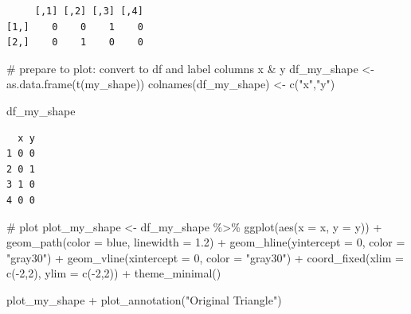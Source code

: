 \documentclass[
  letterpaper,
  DIV=11,
  numbers=noendperiod]{scrartcl}
\newenvironment{Shaded}{\begin{snugshade}}{\end{snugshade}}
\newcommand{\AttributeTok}[1]{\textcolor[rgb]{0.40,0.45,0.13}{#1}}
\newcommand{\CommentTok}[1]{\textcolor[rgb]{0.37,0.37,0.37}{#1}}
\newcommand{\DecValTok}[1]{\textcolor[rgb]{0.68,0.00,0.00}{#1}}
\newcommand{\FloatTok}[1]{\textcolor[rgb]{0.68,0.00,0.00}{#1}}
\newcommand{\FunctionTok}[1]{\textcolor[rgb]{0.28,0.35,0.67}{#1}}
\newcommand{\NormalTok}[1]{\textcolor[rgb]{0.00,0.23,0.31}{#1}}
\newcommand{\OtherTok}[1]{\textcolor[rgb]{0.00,0.23,0.31}{#1}}
\newcommand{\SpecialCharTok}[1]{\textcolor[rgb]{0.37,0.37,0.37}{#1}}
\newcommand{\StringTok}[1]{\textcolor[rgb]{0.13,0.47,0.30}{#1}}
\begin{document}
\begin{verbatim}
     [,1] [,2] [,3] [,4]
[1,]    0    0    1    0
[2,]    0    1    0    0
\end{verbatim}

\begin{Shaded}
\begin{Highlighting}[]
\CommentTok{\# prepare to plot: convert to df and label columns x \& y}
\NormalTok{df\_my\_shape }\OtherTok{\textless{}{-}} \FunctionTok{as.data.frame}\NormalTok{(}\FunctionTok{t}\NormalTok{(my\_shape))  }
\FunctionTok{colnames}\NormalTok{(df\_my\_shape) }\OtherTok{\textless{}{-}} \FunctionTok{c}\NormalTok{(}\StringTok{"x"}\NormalTok{,}\StringTok{"y"}\NormalTok{)}

\NormalTok{df\_my\_shape}
\end{Highlighting}
\end{Shaded}

\begin{verbatim}
  x y
1 0 0
2 0 1
3 1 0
4 0 0
\end{verbatim}

\begin{Shaded}
\begin{Highlighting}[]
\CommentTok{\# plot}
\NormalTok{plot\_my\_shape }\OtherTok{\textless{}{-}}\NormalTok{ df\_my\_shape }\SpecialCharTok{\%\textgreater{}\%} 
  \FunctionTok{ggplot}\NormalTok{(}\FunctionTok{aes}\NormalTok{(}\AttributeTok{x =}\NormalTok{ x, }\AttributeTok{y =}\NormalTok{ y)) }\SpecialCharTok{+}
         \FunctionTok{geom\_path}\NormalTok{(}\AttributeTok{color =} \StringTok{\textquotesingle{}blue\textquotesingle{}}\NormalTok{, }\AttributeTok{linewidth =} \FloatTok{1.2}\NormalTok{) }\SpecialCharTok{+}
         \FunctionTok{geom\_hline}\NormalTok{(}\AttributeTok{yintercept =} \DecValTok{0}\NormalTok{, }\AttributeTok{color =} \StringTok{"gray30"}\NormalTok{) }\SpecialCharTok{+}
         \FunctionTok{geom\_vline}\NormalTok{(}\AttributeTok{xintercept =} \DecValTok{0}\NormalTok{, }\AttributeTok{color =} \StringTok{"gray30"}\NormalTok{) }\SpecialCharTok{+}
         \FunctionTok{coord\_fixed}\NormalTok{(}\AttributeTok{xlim =} \FunctionTok{c}\NormalTok{(}\SpecialCharTok{{-}}\DecValTok{2}\NormalTok{,}\DecValTok{2}\NormalTok{), }\AttributeTok{ylim =} \FunctionTok{c}\NormalTok{(}\SpecialCharTok{{-}}\DecValTok{2}\NormalTok{,}\DecValTok{2}\NormalTok{)) }\SpecialCharTok{+}
         \FunctionTok{theme\_minimal}\NormalTok{()}

\NormalTok{plot\_my\_shape }\SpecialCharTok{+} \FunctionTok{plot\_annotation}\NormalTok{(}\StringTok{"Original Triangle"}\NormalTok{)}
\end{Highlighting}
\end{Shaded}
\end{document}

